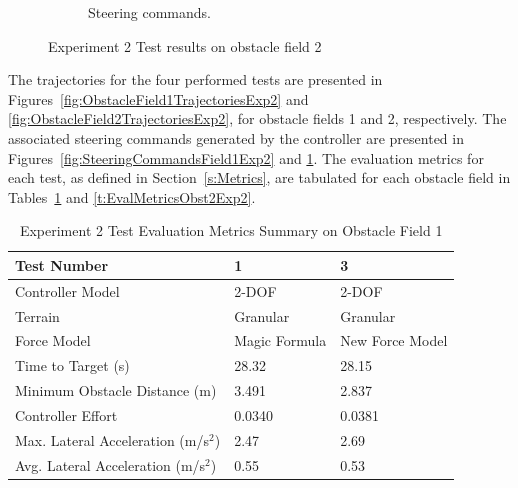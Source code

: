 \documentclass[12pt,onecolumn]{report}
\begin{document}
\begin{figure}
\begin{subfigure}[b]{0.49\columnwidth}
		\caption{\small Steering commands.}   
		\label{fig:SteeringCommandsField2Exp2}
	\end{subfigure}
	\caption{\small Experiment 2 Test results on obstacle field 2}
	\label{fig:Obst2TestDataExp2}
\end{figure}

The trajectories for the four performed tests are presented in Figures~\ref{fig:ObstacleField1TrajectoriesExp2} and \ref{fig:ObstacleField2TrajectoriesExp2}, for obstacle fields 1 and 2, respectively. The associated steering commands generated by the controller are presented in Figures~\ref{fig:SteeringCommandsField1Exp2} and \ref{fig:SteeringCommandsField2Exp2}. The evaluation metrics for each test, as defined in Section~\ref{s:Metrics}, are tabulated for each obstacle field in Tables~\ref{t:EvalMetricsObst1Exp2} and \ref{t:EvalMetricsObst2Exp2}. 

\begin{table}
		\centering
\begin{tabular}{ ||p{6cm}|p{3.5cm}|p{3.5cm}||  }
		\hline
		Test Number & 1 & 3 \\
		\hline
		Controller Model & 2-DOF & 2-DOF \\
		\hline
		Terrain & Granular & Granular\\
		\hline
		Force Model & Magic Formula & New Force Model\\
		\hline
		Time to Target (s)  & 28.32 & 28.15 \\ 
		\hline
		Minimum Obstacle Distance (m) & 3.491 & 2.837 \\
		\hline
		Controller Effort & 0.0340 & 0.0381 \\
		\hline
		Max. Lateral Acceleration (m/s$^{2}$)& 2.47 & 2.69 \\
		\hline
		Avg. Lateral Acceleration (m/s$^{2}$) & 0.55 & 0.53 \\
		\hline
\end{tabular}
\caption{Experiment 2 Test Evaluation Metrics Summary on Obstacle Field 1}
\label{t:EvalMetricsObst1Exp2}
\end{table}
\end{document}
